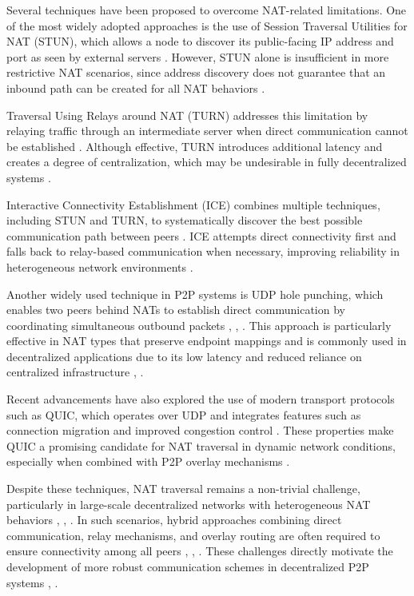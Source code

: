\documentclass[
  12pt,
  oneside,
  a4paper,
  chapter=TITLE,
  section=TITLE,
  english,
  brazil
]{abntex2}
\begin{document}
Several techniques have been proposed to overcome NAT-related limitations. One of the most widely adopted approaches is the use of Session Traversal Utilities for NAT (STUN), which allows a node to discover its public-facing IP address and port as seen by external servers \cite{rfc8489}. However, STUN alone is insufficient in more restrictive NAT scenarios, since address discovery does not guarantee that an inbound path can be created for all NAT behaviors \cite{rfc8489}.

Traversal Using Relays around NAT (TURN) addresses this limitation by relaying traffic through an intermediate server when direct communication cannot be established \cite{rfc8656}. Although effective, TURN introduces additional latency and creates a degree of centralization, which may be undesirable in fully decentralized systems \cite{rfc8656}.

Interactive Connectivity Establishment (ICE) combines multiple techniques, including STUN and TURN, to systematically discover the best possible communication path between peers \cite{rfc8445}. ICE attempts direct connectivity first and falls back to relay-based communication when necessary, improving reliability in heterogeneous network environments \cite{rfc8445}.

Another widely used technique in P2P systems is UDP hole punching, which enables two peers behind NATs to establish direct communication by coordinating simultaneous outbound packets \cite{li2022unreachable}, \cite{rfc8489}, \cite{rfc8445}. This approach is particularly effective in NAT types that preserve endpoint mappings and is commonly used in decentralized applications due to its low latency and reduced reliance on centralized infrastructure \cite{li2022unreachable}, \cite{rfc8489}.

Recent advancements have also explored the use of modern transport protocols such as QUIC, which operates over UDP and integrates features such as connection migration and improved congestion control \cite{rfc9000}. These properties make QUIC a promising candidate for NAT traversal in dynamic network conditions, especially when combined with P2P overlay mechanisms \cite{rfc9000}.

Despite these techniques, NAT traversal remains a non-trivial challenge, particularly in large-scale decentralized networks with heterogeneous NAT behaviors \cite{rfc8489}, \cite{rfc8656}, \cite{rfc8445}. In such scenarios, hybrid approaches combining direct communication, relay mechanisms, and overlay routing are often required to ensure connectivity among all peers \cite{rfc8489}, \cite{rfc8656}, \cite{rfc8445}. These challenges directly motivate the development of more robust communication schemes in decentralized P2P systems \cite{li2022unreachable}, \cite{augustine2022byzantine}.
\end{document}
